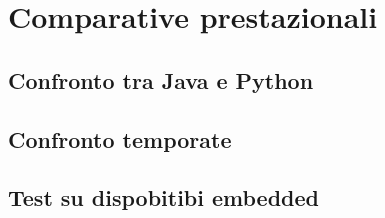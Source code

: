 \chapter{Comparative prestazionali}

\section{Confronto tra Java e Python}

\section{Confronto temporate}

\section{Test su dispobitibi embedded}
